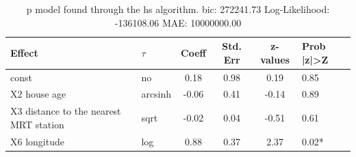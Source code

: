 \begin{table}
	\caption{p model found through the hs algorithm. bic: 272241.73 Log-Likelihood: -136108.06 MAE: 10000000.00}
	\begin{center}
		\begin{tabular}{|l|l|c|c|c|l|}
			\hline
			Effect & $\tau$ & Coeff & Std. Err & z-values & Prob |z|>Z \\
			\hline
			const & no & 0.18 & 0.98 & 0.19 & 0.85 \\
			\hline
			X2 house age & arcsinh & -0.06 & 0.41 & -0.14 & 0.89 \\
			\hline
			X3 distance to the nearest MRT station & sqrt & -0.02 & 0.04 & -0.51 & 0.61 \\
			\hline
			X6 longitude & log & 0.88 & 0.37 & 2.37 & 0.02* \\
			\hline
		\end{tabular}
	\end{center}
\end{table}
